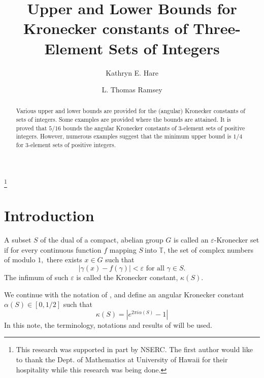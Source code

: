 \documentclass{amsart}
\begin{document}
\title[Kronecker constants]{Upper and Lower Bounds for Kronecker constants
of Three-Element Sets of Integers}
\author{Kathryn E. Hare}
\address{Dept. of Pure Mathematics\\
University of Waterloo\\
Waterloo, Ont.\\
Canada, N2L 3G1}
\thanks{This research was supported in part by NSERC. The first author would
like to thank the Dept. of Mathematics at University of Hawaii for their
hospitality while this research was being done.}
\author{L. Thomas Ramsey}
\address{Dept. of Mathematics\\
University of Hawaii at Manoa\\
Honolulu, Hi\\
USA, 96822}

\begin{abstract}
Various upper and lower bounds are provided for the (angular) Kronecker constants of sets of integers.  Some examples are provided where the bounds are attained.  It is proved that $5/16$ bounds the angular Kronecker constants of 3-element sets of positive integers. However, numerous examples suggest that the minimum upper bound is $1/4$ for 3-element sets of positive integers.
\end{abstract}

\maketitle

\section{Introduction}

A subset $S$ of the dual of a compact, abelian group $G$ is called an $\varepsilon $-Kronecker set if for every continuous function $f$ mapping $S\mathbb{\ }$into $\mathbb{T}$, the set of complex numbers of modulo $1,$
there exists $x\in G$ such that
$$
\left\vert \gamma (x)-f(\gamma )\right\vert <\varepsilon \text{ for all }\gamma \in S\text{.}
$$
The infimum of such $\varepsilon $ is called the Kronecker constant, $\kappa
(S)$.

We continue with the notation of \cite{HR}, and define an angular Kronecker constant
$\alpha(S) \in [0,1/2]$ such that
$$
\kappa(S)=\left|e^{2\pi i \alpha(S)}-1 \right|
$$
In this note, the terminology, notations and results of \cite{HR} will be used.
\end{document}
